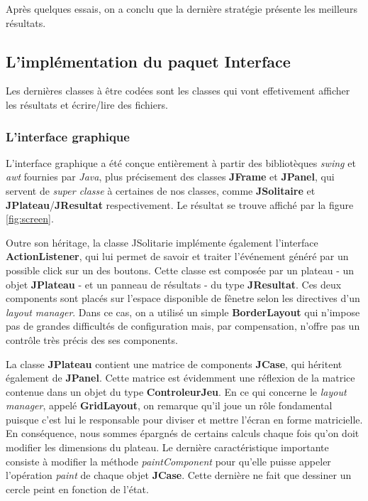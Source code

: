 \documentclass{article}
\begin{document}
\vspace{12pt}
 
 Après quelques essais, on a conclu que la dernière stratégie présente les
 meilleurs résultats.
 
\subsection{L'implémentation du paquet \og Interface \fg}

Les dernières classes à être codées sont les classes qui vont
effetivement afficher les résultats et écrire/lire des fichiers.

\subsubsection {L'interface graphique} 

L'interface graphique a été conçue entièrement à partir des bibliotèques
\textit{swing} et \textit{awt} fournies par \textit{Java}, plus précisement des
classes \textbf{JFrame} et \textbf{JPanel}, qui servent de \textit{super classe}
à certaines de nos classes, comme \textbf{JSolitaire} et
\textbf{JPlateau}/\textbf{JResultat} respectivement. Le résultat se trouve
affiché par la figure \ref{fig:screen}.

\vspace{12pt}

Outre son héritage, la classe JSolitarie implémente également l'interface
\textbf{ActionListener}, qui lui permet de savoir et traiter l'événement généré
par un possible click sur un des boutons. Cette classe est composée par un
plateau - un objet \textbf{JPlateau} - et un panneau de résultats - du type
\textbf{JResultat}. Ces deux components sont placés sur l'espace disponible de
fênetre selon les directives d'un \textit{layout manager}. Dans ce cas, on a
utilisé un simple \textbf{BorderLayout} qui n'impose pas de grandes difficultés
de configuration mais, par compensation, n'offre pas un contrôle très précis des
ses components.

\vspace{12pt}

La classe \textbf{JPlateau} contient une matrice de components \textbf{JCase},
qui héritent également de \textbf{JPanel}. Cette matrice est évidemment
une réflexion de la matrice contenue dans un objet du type
\textbf{ControleurJeu}. En ce qui concerne le \textit{layout manager},
appelé \textbf{GridLayout}, on remarque qu'il joue un rôle fondamental puisque
c'est lui le responsable pour diviser et mettre l'écran en forme matricielle.
En conséquence, nous sommes épargnés de certains calculs chaque fois qu'on doit
modifier les dimensions du plateau. Le dernière caractéristique importante
consiste à modifier la méthode \textit{paintComponent} pour qu'elle puisse
appeler l'opération \textit{paint} de chaque objet \textbf{JCase}. Cette
dernière ne fait que dessiner un cercle peint en fonction de l'état.
\end{document}
